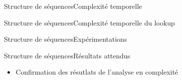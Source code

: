 \begin{frame}{Structure de séquences}{Complexité temporelle}

  \begin{center}
    
  \end{center}

\end{frame}

\begin{frame}{Structure de séquences}{Complexité temporelle du lookup}
  
  \begin{center}
    
  \end{center}
  
\end{frame}


\begin{frame}{Structure de séquences}{Expérimentations}
  
\end{frame}

\begin{frame}{Structure de séquences}{Résultats attendus}
  
  \begin{itemize}
  \item Confirmation des résutlats de l'analyse en complexité
  \end{itemize}

\end{frame}



